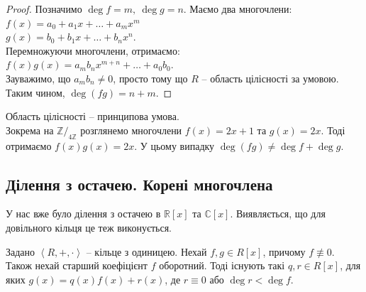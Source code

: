 \documentclass{math_library}
\begin{document}
\begin{proof}
Позначимо $\deg f = m,\ \deg g = n$. Маємо два многочлени:\\
$f(x) = a_0 + a_1 x + \dots + a_m x^m$\\
$g(x) = b_0 + b_1 x + \dots + b_n x^n$.\\
Перемножуючи многочлени, отримаємо:\\
$f(x)g(x) = a_m b_n x^{m+n} + \dots + a_0 b_0$.\\
Зауважимо, що $a_m b_n \neq 0$, просто тому що $R$ -- область цілісності за умовою. Таким чином, $\deg(fg) = n + m$.
\end{proof}

\begin{remark}
Область цілісності -- принципова умова.\\
Зокрема на $\mathbb{Z}/_{4 \mathbb{Z}}$ розглянемо многочлени $f(x) = 2x + 1$ та $g(x) = 2x$. Тоді отримаємо $f(x)g(x) = 2x$. У цьому випадку $\deg (fg) \neq \deg f + \deg g$.
\end{remark}

\subsection{Ділення з остачею. Корені многочлена}
У нас вже було ділення з остачею в $\mathbb{R}[x]$ та $\mathbb{C}[x]$. Виявляється, що для довільного кільця це теж виконується.

\begin{proposition}
Задано $\left< R,+,\cdot \right>$ -- кільце з одиницею. Нехай $f,g \in R[x]$, причому $f \not\equiv 0$. Також нехай старший коефіцієнт $f$ оборотний. Тоді існують такі $q,r \in R[x]$, для яких $g(x) = q(x)f(x) + r(x)$, де $r \equiv 0$ або $\deg r < \deg f$. 
\end{proposition}
\end{document}

